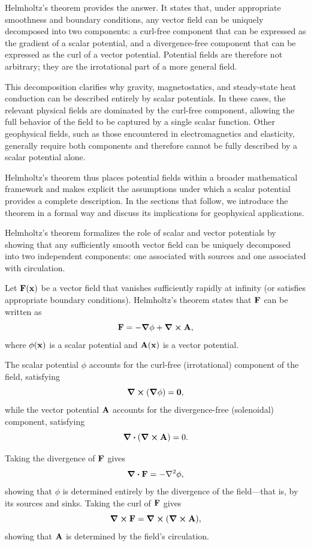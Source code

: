 Helmholtz's theorem provides the answer. It states that, under appropriate smoothness and boundary conditions, any vector field can be uniquely decomposed into two components: a curl-free component that can be expressed as the gradient of a scalar potential, and a divergence-free component that can be expressed as the curl of a vector potential. Potential fields are therefore not arbitrary; they are the irrotational part of a more general field.

This decomposition clarifies why gravity, magnetostatics, and steady-state heat conduction can be described entirely by scalar potentials. In these cases, the relevant physical fields are dominated by the curl-free component, allowing the full behavior of the field to be captured by a single scalar function. Other geophysical fields, such as those encountered in electromagnetics and elasticity, generally require both components and therefore cannot be fully described by a scalar potential alone.

Helmholtz's theorem thus places potential fields within a broader mathematical framework and makes explicit the assumptions under which a scalar potential provides a complete description. In the sections that follow, we introduce the theorem in a formal way and discuss its implications for geophysical applications.

Helmholtz's theorem formalizes the role of scalar and vector potentials by showing
that any sufficiently smooth vector field can be uniquely decomposed into two
independent components: one associated with sources and one associated with
circulation.

Let $\vb{F}(\vb{x})$ be a vector field that vanishes sufficiently rapidly at
infinity (or satisfies appropriate boundary conditions). Helmholtz's theorem
states that $\vb{F}$ can be written as
\[
    \vb{F} = -\grad \phi + \curl \vb{A},
\]
where $\phi(\vb{x})$ is a scalar potential and $\vb{A}(\vb{x})$ is a vector
potential.

The scalar potential $\phi$ accounts for the curl-free (irrotational) component
of the field, satisfying
\[
    \curl(\grad \phi) = \vb{0},
\]
while the vector potential $\vb{A}$ accounts for the divergence-free
(solenoidal) component, satisfying
\[
    \div(\curl \vb{A}) = 0.
\]

Taking the divergence of $\vb{F}$ gives
\[
    \div \vb{F} = -\laplacian \phi,
\]
showing that $\phi$ is determined entirely by the divergence of the field—that is,
by its sources and sinks. Taking the curl of $\vb{F}$ gives
\[
    \curl \vb{F} = \curl(\curl \vb{A}),
\]
showing that $\vb{A}$ is determined by the field's circulation.

